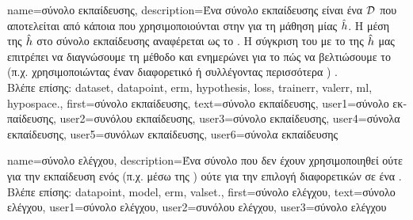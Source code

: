 {name={\foreignlanguage{greek}{σύνολο εκπαίδευσης}},
	description={\foreignlanguage{greek}{Ένα σύνολο εκπαίδευσης είναι ένα}  
		$\mathcal{D}$ \foreignlanguage{greek}{που αποτελείται από κάποια}  \foreignlanguage{greek}{που 
		χρησιμοποι\-ού\-νται στην}  \foreignlanguage{greek}{για τη μάθηση μίας}  $\hat{h}$. 
		\foreignlanguage{greek}{Η μέση}  \foreignlanguage{greek}{της $\hat{h}$ στο σύνολο εκπαίδευσης 
		αναφέρεται ως το} . \foreignlanguage{greek}{Η σύγκριση του}  \foreignlanguage{greek}{με το}  
		 \foreignlanguage{greek}{της $\hat{h}$ μας επιτρέπει να διαγνώσουμε τη μέθοδο}  
		\foreignlanguage{greek}{και ενημερώνει για το πώς να βελτιώσουμε το}  
		\foreignlanguage{greek}{(π.χ. χρησιμοποιώντας έναν διαφορετικό}  
		\foreignlanguage{greek}{ή συλλέγοντας περισσότερα} ) \cite[Sec. 6.6]{MLBasics}.\\
		\foreignlanguage{greek}{Βλέπε επίσης:} \gls{dataset}, \gls{datapoint}, \gls{erm}, \gls{hypothesis}, \gls{loss}, \gls{trainerr}, \gls{valerr}, \gls{ml}, \gls{hypospace}.},
	first={\foreignlanguage{greek}{σύνολο εκπαίδευσης}},
	text={\foreignlanguage{greek}{σύ\-νο\-λο εκ\-παί\-δευ\-σης}},
	user1={\foreignlanguage{greek}{σύνολο εκπαίδευσης}}, %
	user2={\foreignlanguage{greek}{συνόλου εκπαίδευσης}}, %
	user3={\foreignlanguage{greek}{σύνολο εκπαί\-δευσης}}, %
	user4={\foreignlanguage{greek}{σύνολα εκπαίδευσης}}, %
	user5={\foreignlanguage{greek}{συνόλων εκπαί\-δευ\-σης}}, %
	user6={\foreignlanguage{greek}{σύνολα εκπαίδευσης}} %
}

{name={\foreignlanguage{greek}{σύνολο ελέγχου}},
	description={\foreignlanguage{greek}{Ένα σύνολο}  
		\foreignlanguage{greek}{που δεν έχουν χρησιμοποιηθεί ούτε για την εκπαίδευση ενός}  
		(\foreignlanguage{greek}{π.χ. μέσω της} ) \foreignlanguage{greek}{ούτε για την επιλογή διαφορετικών} 
		 \foreignlanguage{greek}{σε ένα} .\\
		\foreignlanguage{greek}{Βλέπε επίσης:} \gls{datapoint}, \gls{model}, \gls{erm}, \gls{valset}.},
	first={\foreignlanguage{greek}{σύνολο ελέγχου}},
	text={\foreignlanguage{greek}{σύνολο ελέγχου}}, 
	user1={\foreignlanguage{greek}{σύνολο ελέγχου}}, %
	user2={\foreignlanguage{greek}{συνόλου ελέγχου}}, %
	user3={\foreignlanguage{greek}{σύνολο ελέγχου}} %
}


